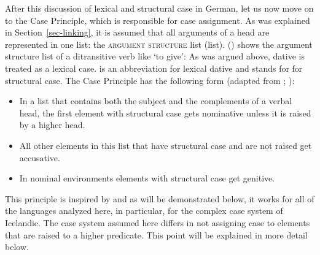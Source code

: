 








After this discussion of lexical and structural case in German, let us now move on to the Case Principle,
which is responsible for case assignment. As was explained in Section~\ref{sec-linking}, it is assumed that all arguments of a
head are represented in one list: the \textsc{argument structure} list (\argst list). 
() shows the argument structure list of a ditransitive verb like  `to give':
\ea
{}
\z
As was argued above, dative is treated as a lexical case.  is an abbreviation for lexical
dative and  stands for for structural case. The Case
Principle has the following form (adapted from \citealp{Prze99}; \citealp{Meurers99b}):

\begin{principle-break}
\label{case-p}
\begin{itemize}
\item In a list that contains both the subject and the complements of a verbal head, the first
  element with structural case gets nominative unless it is raised by a higher head.
\item All other elements in this list that have structural case and are not raised get accusative.
\item In nominal environments elements with structural case get genitive.
\end{itemize}
\end{principle-break}
This principle is inspired by \citet*{YMJ87} and as will be demonstrated below, it works for all of
the languages analyzed here, in particular, for the complex case system of Icelandic. The case
system assumed here differs in not assigning case to elements that are raised
to a higher predicate. This point will be explained in more detail below.

